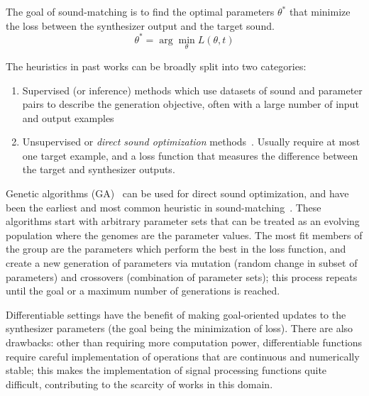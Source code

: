 \documentclass[lettersize,journal]{IEEEtran}
\providecommand{\gls}[1]{#1}
\begin{document}
The goal of sound-matching is to find the optimal parameters $\theta^*$ that minimize the loss between the synthesizer output and the target sound. 
\[
\theta^* = \arg\min_{\theta} L(\theta,t)
\]


The heuristics in past works can be broadly split into two categories:
\begin{enumerate}
    \item Supervised (or inference) methods which use datasets of sound and parameter pairs to describe the generation objective, often with a large number of input and output examples~\cite{engel2020ddsp,salimi2020make,yee2018automatic,esling2019flow}
    \item Unsupervised or \textit{direct sound optimization} methods~\cite{horner1993machine,mitchell2007evolutionary,yee2018automatic,vahidi2023mesostructures}. Usually require at most one target example, and a loss function that measures the difference between the target and synthesizer outputs. 
\end{enumerate}


Genetic algorithms (\gls{GA})~\cite{holland1992genetic} can be used for direct sound optimization, and have been the earliest and most common heuristic in sound-matching~\cite{horner1993machine,mitchell2007evolutionary,yee2018automatic}. These algorithms start with arbitrary parameter sets that can be treated as an evolving population where the genomes are the parameter values. The most fit members of the group are the parameters which perform the best in the loss function, and create a new generation of parameters via mutation (random change in subset of parameters) and crossovers (combination of parameter sets); this process repeats until the goal or a maximum number of generations is reached.

 Differentiable settings have the benefit of making goal-oriented updates to the synthesizer parameters (the goal being the minimization of loss). There are also drawbacks: other than requiring more computation power, differentiable functions require careful implementation of operations that are continuous and numerically stable; this makes the implementation of signal processing functions quite difficult, contributing to the scarcity of works in this domain.

\end{document}
